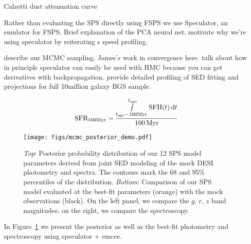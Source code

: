 



Calzetti dust attenuation curve

Rather than evaluating the SPS directly using FSPS we use {\sc Speculator}, an
emulator for FSPS. Brief explanation of the PCA neural net. motivate why we're
using speculator by reiterating \cite{alsing2019}s speed profiling. 

describe our MCMC sampling. James's work in convergence here. talk about how in
principle speculator can easily be used with HMC because you can get
derivatives with backpropagation. provide detailed profiling of SED fitting and
projections for full 10million galaxy BGS sample. 

\begin{equation}
    {\rm SFR}_{100{\rm Myr}} = \frac{\int\limits_{t_{\rm age} - 100{\rm
    Myr}}^{t_{\rm age}}{\rm SFH}(t)\,{\rm d}t}{100\,{\rm Myr}}
\end{equation} 

\begin{figure}
\begin{center}
    \texttt{[image: figs/mcmc\_posterior\_demo.pdf]}
    \label{fig:posterior}
    \caption{
        \emph{Top}: 
        Posterior probability distribution of our 12 SPS model parameters
        derived from joint SED modeling of the mock DESI photometry and
        spectra.
        The contours mark the 68 and 95\% percentiles of the distribution. 
        \emph{Bottom}: 
        Comparison of our SPS model evaluated at the best-fit parameters
        (orange) with the mock observations (black). 
        On the left panel, we compare the $g$, $r$, $z$ band magnitudes; on the
        right, we compare the spectroscopy.  
    }
\end{center}
\end{figure}

In Figure~\ref{fig:posterior} we present the posterior as well as the best-fit photometry and
spectroscopy using speculator + emcee. 

